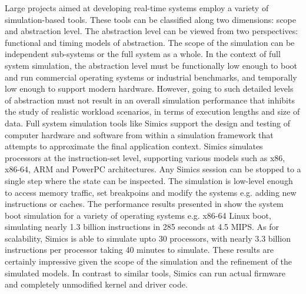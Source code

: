 Large projects aimed at developing real-time systems employ a variety of simulation-based tools. These tools can be classified along two dimensions: scope and abstraction level. The abstraction level can be viewed from two perspectives: functional and timing models of abstraction. The scope of the simulation can be independent sub-systems or the full system as a whole. In the context of full system simulation, the abstraction level must be functionally low enough to boot and run commercial operating systems or industrial benchmarks, and temporally low enough to support modern hardware. However, going to such detailed levels of abstraction must not result in an overall simulation performance that inhibits the study of realistic workload scenarios, in terms of execution lengths and size of data. Full system simulation tools like Simics \cite{magnusson2002simics} support the design and testing of computer hardware and software from within a simulation framework that attempts to approximate the final application context. Simics simulates processors at the instruction-set level, supporting various models such as x86, x86-64, ARM and PowerPC architectures. Any Simics session can be stopped to a single step where the state can be inspected. The simulation is low-level enough to access memory traffic, set breakpoins and modify the systems e.g. adding new instructions or caches. The performance results presented in \cite{magnusson2002simics} show the system boot simulation for a variety of operating systems e.g. x86-64 Linux boot, simulating nearly 1.3 billion instructions in 285 seconds at 4.5 MIPS. As for scalability, Simics is able to simulate upto 30 processors, with nearly 3.3 billion instructions per processor taking 40 minutes to simulate. These results are certainly impressive given the scope of the simulation and the refinement of the simulated models. In contrast to similar tools, Simics can run actual firmware and completely unmodified kernel and driver code.

